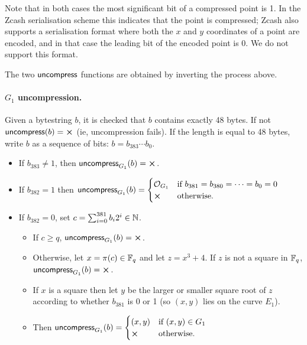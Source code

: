 Note that in both cases the most significant bit of a compressed point is 1.
In the Zcash serialisation scheme this indicates that the point is compressed;
Zcash also supports a serialisation format where both the $x$ and $y$
coordinates of a point are encoded, and in that case the leading bit of the
encoded point is 0.  We do not support this format.


The two $\mathsf{uncompress}$ functions are obtained by inverting the process above.

\paragraph{$G_1$ uncompression.}  Given a bytestring $b$, it is checked that
$b$ contains exactly 48 bytes.  If not $\uncompress(b) = \errorX$ (ie,
uncompression fails).  If the length is equal to 48 bytes, write $b$ as a
sequence of bits: $b = b_{383} \cdots b_0$.
\begin{itemize}
\item If $b_{383} \neq 1$, then $\uncompress_{G_1}(b) = \errorX$.
\item If $b_{382} = 1$ then $\uncompress_{G_1}(b) =
\begin{cases}
\mathcal{O}_{G_1} & \text{if $b_{381} = b_{380} = \cdots = b_0 = 0$}\\
\errorX & \text{otherwise}.
\end{cases}$
\item If $b_{382}=0$, set $c=\sum_{i=0}^{381}b_i2^i \in \mathbb{N}$.
\begin{itemize}
\item If $c \geq q$, $\uncompress_{G_1}(b) = \errorX$.
\item Otherwise, let $x = \pi(c) \in \mathbb{F}_q$ and let $z = x^3+4$. If $z$ is not a square in $\mathbb{F}_q$, $\uncompress_{G_1}(b) = \errorX$.
\item If $x$ is a square then let $y$ be the larger or smaller square root of $z$ according to
whether $b_{381}$ is 0 or 1 (so $(x,y)$ lies on the curve $E_1$).
\item Then $\uncompress_{G_1}(b) = \begin{cases}
(x,y) & \text{if $(x,y) \in G_1$}\\
\errorX & \text{otherwise}.
\end{cases}$
\end{itemize}
\end{itemize}


